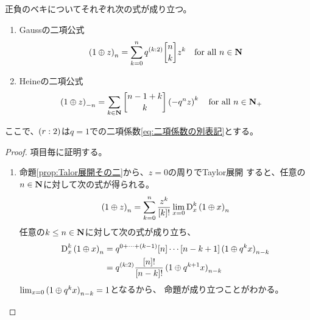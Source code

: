 {	\begin{proposition}[ベキ展開]\label{prop:ベキ展開} %
		正負のベキについてそれぞれ次の式が成り立つ。
		\begin{enumerate}\setlength{\itemsep}{-1mm} %
			\item\label{eq:Gaussの二項公式} Gaussの二項公式
			\begin{equation*}\begin{split}
				\plr{1\oplus z}_n = \sum_{k=0}^n q^{\plr{k:2}}\qbinom{n}{k}z^k
				\quad\text{for all } n\in\sizen
			\end{split}\end{equation*}
			\item\label{eq:Heineの二項公式} Heineの二項公式
			\begin{equation*}\begin{split}
				\plr{1\oplus z}_{-n} &= \sum_{k\in\sizen} \qbinom{n-1+k}{k}
				\plr{-q^nz}^k \quad\text{for all } n\in\sizen_+
			\end{split}\end{equation*}
		\end{enumerate} %
		ここで、$\mathinner{({r:2})}$は$q=1$での二項係数\eqref{eq:二項係数の別表記}とする。
		\EOP
	\end{proposition} %
	\begin{proof} %
		項目毎に証明する。
		\begin{enumerate}\setlength{\itemsep}{-1mm} %
			\item 命題\ref{prop:Talor展開その二}から、$z=0$の周りでTaylor展開
			すると、任意の$n\in\mathbf{N}$に対して次の式が得られる。
			\begin{equation*}\begin{split}
				\mathinner{({1\oplus z})}_n = \sum_{k=0}^n\frac{z^k}{{\mathinner{[{k}]}}!}
					\lim_{x=0}{\mathinner{\operatorname{D}}}_x^k\mathinner{({1\oplus x})}_n
			\end{split}\end{equation*}
			任意の$k\le n\in\mathbf{N}$に対して次の式が成り立ち、
			\begin{equation*}\begin{split}
				{\mathinner{\operatorname{D}}}_x^k\mathinner{({1\oplus x})}_n 
				&= q^{0+\cdots+\mathinner{({k-1})}}{\mathinner{[{n}]}}\cdots{\mathinner{[{n-k+1}]}}\mathinner{({1\oplus q^kx})}_{n-k} \\
				&= q^{\mathinner{({k:2})}}\frac{{\mathinner{[{n}]}}!}{{\mathinner{[{n-k}]}}!}\mathinner{({1\oplus q^{k+1}x})}_{n-k} \\
			\end{split}\end{equation*}
			$\lim_{x=0}\mathinner{({1\oplus q^kx})}_{n-k} = 1$となるから、
			命題が成り立つことがわかる。

\end{enumerate}
\end{proof}}
